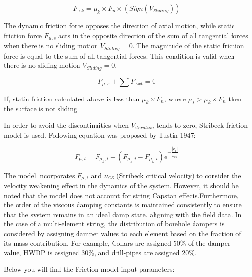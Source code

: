 \begin{equation}\label{dyanmic_force}
  F_{\mu\; k} = \mu_{k}\times F_{n} \times (Sign(V_{Sliding}))
\end{equation}

The dynamic friction force opposes the direction of axial motion, while static friction force $F_{\mu,s}$ acts in the opposite direction of the sum of all tangential forces when there is no sliding motion $V_{Sliding}=0$. The magnitude of the static friction force is equal to the sum of all tangential forces. This condition is valid when there is no sliding motion $V_{Sliding}=0$.

\begin{equation}\label{zero}
  F_{\mu,s} + \sum F_{Ext} = 0
\end{equation}

If, static friction calculated above is less than $\mu_{k}\times F_{n}$, where $\mu_{s} > \mu_{k}\times F_{n}$ then the surface is not sliding.

In order to avoid the discontinuities when $V_{iteration}$ tends to zero, Stribeck friction model is used. Following equation was proposed by Tustin 1947:

\begin{equation}\label{Stribeck velocity}
  F_{\mu,i} = F_{\mu_{k},i} + (F_{\mu_{s},i} - F_{\mu_{k},i})e^{-\dfrac{|\nu_{i}|}{\nu_{cs}}}
\end{equation} 

The model incorporates $F_{\mu,i}$ and $\nu_{CS}$ (Stribeck critical velocity) to consider the velocity weakening effect in the dynamics of the system. However, it should be noted that the model does not account for string Capstan effects.Furthermore, the order of the viscous damping constants is maintained consistently to ensure that the system remains in an ideal damp state, aligning with the field data. In the case of a multi-element string, the distribution of borehole dampers is considered by assigning damper values to each element based on the fraction of its mass contribution. For example, Collars are assigned 50\% of the damper value, HWDP is assigned 30\%, and drill-pipes are assigned 20\%. 

Below you will find the Friction model input parameters:

